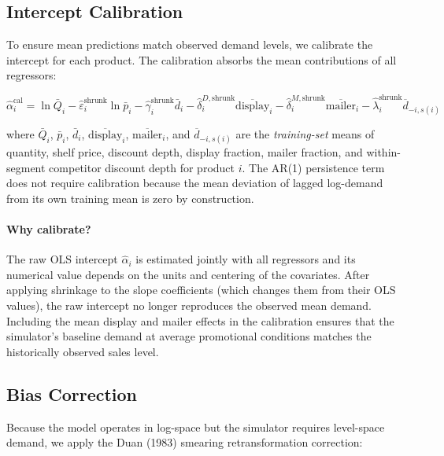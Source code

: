 \documentclass[12pt,a4paper]{article}
\begin{document}
\subsection{Intercept Calibration}
\label{sec:calibration}

To ensure mean predictions match observed demand levels, we
calibrate the intercept for each product. The calibration absorbs the
mean contributions of all regressors:

\begin{equation}
\label{eq:intercept-cal}
\hat{\alpha}_i^{\text{cal}} = \ln \bar{Q}_i
- \hat{\varepsilon}_i^{\text{shrunk}} \ln \bar{p}_i
- \hat{\gamma}_i^{\text{shrunk}} \bar{d}_i
- \hat{\delta}_{i}^{D,\text{shrunk}} \overline{\text{display}}_i
- \hat{\delta}_{i}^{M,\text{shrunk}} \overline{\text{mailer}}_i
- \hat{\lambda}_{i}^{\text{shrunk}} \overline{d}_{-i,s(i)}
\end{equation}

where $\bar{Q}_i$, $\bar{p}_i$, $\bar{d}_i$,
$\overline{\text{display}}_i$, $\overline{\text{mailer}}_i$, and
$\overline{d}_{-i,s(i)}$ are the \emph{training-set} means of
quantity, shelf price, discount depth, display fraction, mailer
fraction, and within-segment competitor discount depth for product
$i$. The AR(1) persistence term does not require calibration because
the mean deviation of lagged log-demand from its own training mean
is zero by construction.

\paragraph{Why calibrate?}
The raw OLS intercept $\hat{\alpha}_i$ is estimated jointly with all
regressors and its numerical value depends on the units and centering
of the covariates. After applying shrinkage to the slope
coefficients (which changes them from their OLS values), the raw
intercept no longer reproduces the observed mean demand. Including
the mean display and mailer effects in the calibration ensures that
the simulator's baseline demand at average promotional conditions
matches the historically observed sales level.

\subsection{Bias Correction}

Because the model operates in log-space but the simulator requires
level-space demand, we apply the Duan (1983) smearing retransformation
correction:
\end{document}
